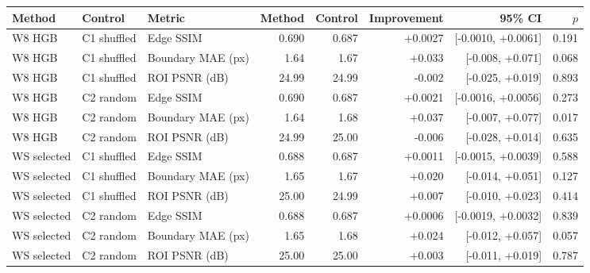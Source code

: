 \begin{tabular}{lllrrrrr}
\toprule
Method & Control & Metric & Method & Control & Improvement & 95\% CI & $p$ \\
\midrule
W8 HGB & C1 shuffled & Edge SSIM & 0.690 & 0.687 & +0.0027 & [-0.0010, +0.0061] & 0.191 \\
W8 HGB & C1 shuffled & Boundary MAE (px) & 1.64 & 1.67 & +0.033 & [-0.008, +0.071] & 0.068 \\
W8 HGB & C1 shuffled & ROI PSNR (dB) & 24.99 & 24.99 & -0.002 & [-0.025, +0.019] & 0.893 \\
W8 HGB & C2 random & Edge SSIM & 0.690 & 0.687 & +0.0021 & [-0.0016, +0.0056] & 0.273 \\
W8 HGB & C2 random & Boundary MAE (px) & 1.64 & 1.68 & +0.037 & [-0.007, +0.077] & 0.017 \\
W8 HGB & C2 random & ROI PSNR (dB) & 24.99 & 25.00 & -0.006 & [-0.028, +0.014] & 0.635 \\
WS selected & C1 shuffled & Edge SSIM & 0.688 & 0.687 & +0.0011 & [-0.0015, +0.0039] & 0.588 \\
WS selected & C1 shuffled & Boundary MAE (px) & 1.65 & 1.67 & +0.020 & [-0.014, +0.051] & 0.127 \\
WS selected & C1 shuffled & ROI PSNR (dB) & 25.00 & 24.99 & +0.007 & [-0.010, +0.023] & 0.414 \\
WS selected & C2 random & Edge SSIM & 0.688 & 0.687 & +0.0006 & [-0.0019, +0.0032] & 0.839 \\
WS selected & C2 random & Boundary MAE (px) & 1.65 & 1.68 & +0.024 & [-0.012, +0.057] & 0.057 \\
WS selected & C2 random & ROI PSNR (dB) & 25.00 & 25.00 & +0.003 & [-0.011, +0.019] & 0.787 \\
\bottomrule
\end{tabular}
